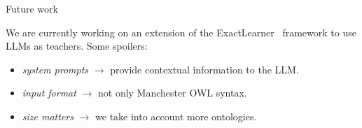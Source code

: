 \documentclass[presentation]{beamer}\mode<presentation>{\usetheme{blackAMSBolognaFC}}
\begin{document}
\begin{frame}[c]{Future work}

    \vfill
    We are currently working on an extension of the ExactLearner~ framework to use LLMs as teachers.
    Some spoilers:
    \vfill
    \begin{itemize}
        \item \emph{system prompts} $\rightarrow$ provide contextual information to the LLM.
        \vfill
        \item \emph{input format} $\rightarrow$ not only Manchester OWL syntax.
        \vfill
        \item \emph{size matters} $\rightarrow$ we take into account more ontologies.
        \vfill
    \end{itemize}
    \vfill

\end{frame}

\section*{}
\frame{\titlepage}

\section*{\bibname}
\end{document}
